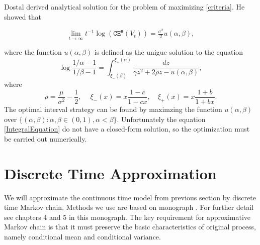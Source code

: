 Dostal \cite{Dostal} derived analytical solution for the problem of maximizing \eqref{criteria}. He showed that

\begin{equation}
\lim_{t\rightarrow\infty}t^{-1}\log(\texttt{CE}^{\texttt{H}}(V_t))=\tfrac{\sigma^2}{2} u(\alpha,\beta),
\end{equation}

where the function $u(\alpha,\beta)$ is defined as the unigue solution to the equation
\begin{equation}
\label{IntegralEquation}
\log\frac{1/\alpha-1}{1/\beta-1}=\int_{\xi_{-}(\beta)}^{\xi_{+}(\alpha)}\frac{dz}{\gamma z^2 +2\rho z - u(\alpha,\beta)},
\end{equation}
where 
\[\rho=\frac{\mu}{\sigma^2}-\frac{1}{2}, \quad\ \xi_{-}(x)=x\frac{1-c}{1-c x}, \quad \xi_{+}(x)=x\frac{1+b}{1+b x}.\]
The optimal interval strategy can be found by maximzing the function $u(\alpha,\beta)$ over $\{(\alpha,\beta):\alpha,\beta\in(0,1),\alpha<\beta\}$.
Unfortunately the equation \ref{IntegralEquation} do not have a closed-form solution, so the optimization must be carried out numerically.

\section{Discrete Time Approximation}


We will approximate the continuous time model from previous section by discrete time Markov chain. Methods we use are based on monograph \cite{KushnerDupuis}. For further detail see chapters 4 and 5 in this monograph. %
The key requirement for approximative Markov chain is that it must preserve the basic characteristics of original process, namely conditional mean and conditional variance.


